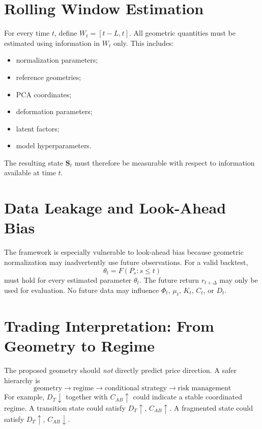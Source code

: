 \documentclass[11pt,a4paper]{article}
\numberwithin{equation}{section}
\begin{document}
\section{Rolling Window Estimation}

For every time $t$, define $W_t=[t-L,t]$. All geometric quantities
must be estimated using information in $W_t$ only. This includes:
\begin{itemize}
\item normalization parameters;
\item reference geometries;
\item PCA coordinates;
\item deformation parameters;
\item latent factors;
\item model hyperparameters.
\end{itemize}
The resulting state $\mathbf{S}_t$ must therefore be measurable with
respect to information available at time $t$.

\section{Data Leakage and Look-Ahead Bias}

The framework is especially vulnerable to look-ahead bias because
geometric normalization may inadvertently use future observations.
For a valid backtest,
\begin{equation}
\theta_t=F(P_s:s\leq t)
\end{equation}
must hold for every estimated parameter $\theta_t$. The future
return $r_{t+\Delta}$ may only be used for evaluation. No future
data may influence $\Phi_t$, $\mu_t$, $K_t$, $C_t$, or $D_t$.

\section{Trading Interpretation: From Geometry to Regime}

The proposed geometry should \emph{not} directly predict price
direction. A safer hierarchy is
\[
\boxed{
\text{geometry}\rightarrow\text{regime}\rightarrow
\text{conditional strategy}\rightarrow\text{risk management}
}
\]
For example, $D_T\downarrow$ together with $C_{AB}\uparrow$ could
indicate a stable coordinated regime. A transition state could
satisfy $D_T\uparrow$, $C_{AB}\uparrow$. A fragmented state could
satisfy $D_T\uparrow$, $C_{AB}\downarrow$.
\end{document}
